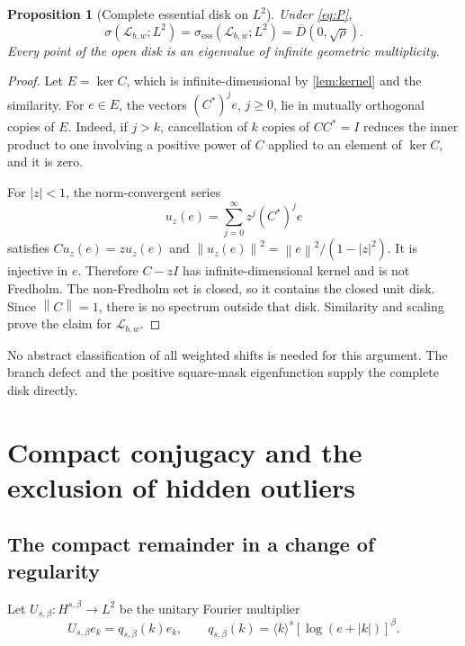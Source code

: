 \documentclass[11pt,a4paper]{article}
\newtheorem{proposition}[theorem]{Proposition}
\theoremstyle{definition}
\theoremstyle{remark}
\newcommand{\Lop}{\mathcal L}
\newcommand{\ess}{\mathrm{ess}}
\newcommand{\norm}[1]{\left\lVert#1\right\rVert}
\newcommand{\br}[1]{\langle#1\rangle}
\newcommand{\Disk}[1]{\overline{D}(0,#1)}
\numberwithin{equation}{section}
\begin{document}
\begin{proposition}[Complete essential disk on $L^2$]
\label{prop:L2-spectrum}
Under \eqref{eq:P},
\begin{equation}
 \sigma(\Lop_{b,w};L^2)=\sigma_{\ess}(\Lop_{b,w};L^2)
 =\Disk{\sqrt\rho}.
 \label{eq:L2-disk}
\end{equation}
Every point of the open disk is an eigenvalue of infinite geometric
multiplicity.
\end{proposition}
\begin{proof}
Let $E=\ker C$, which is infinite-dimensional by \cref{lem:kernel} and the
similarity. For $e\in E$, the vectors $(C^*)^je$, $j\ge0$, lie in mutually
orthogonal copies of $E$. Indeed, if $j>k$, cancellation of $k$ copies of
$CC^*=I$ reduces the inner product to one involving a positive power of $C$
applied to an element of $\ker C$, and it is zero.

For $|z|<1$, the norm-convergent series
\begin{equation}
 u_z(e)=\sum_{j=0}^{\infty}z^j(C^*)^je
 \label{eq:disk-eigenvectors}
\end{equation}
satisfies $Cu_z(e)=zu_z(e)$ and
$\norm{u_z(e)}^2=\norm e^2/(1-|z|^2)$. It is injective in $e$.
Therefore $C-zI$ has infinite-dimensional kernel and is not Fredholm.
The non-Fredholm set is closed, so it contains the closed unit disk.
Since $\norm C=1$, there is no spectrum outside that disk. Similarity and
scaling prove the claim for $\Lop_{b,w}$.
\end{proof}

No abstract classification of all weighted shifts is needed for this
argument. The branch defect and the positive square-mask eigenfunction
supply the complete disk directly.

\section{Compact conjugacy and the exclusion of hidden outliers}
\label{sec:sobolev-proof}

\subsection{The compact remainder in a change of regularity}
Let $U_{s,\beta}:H^{s,\beta}\to L^2$ be the unitary Fourier multiplier
\begin{equation}
 U_{s,\beta}e_k=q_{s,\beta}(k)e_k,\qquad
 q_{s,\beta}(k)=\br{k}^{s}[\log(e+|k|)]^\beta.
 \label{eq:unitary}
\end{equation}
\end{document}
